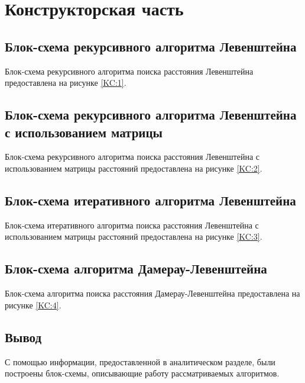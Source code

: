 \documentclass[12pt]{report}
\begin{document}
\newpage

\chapter{Конструкторская часть}
\section{Блок-схема рекурсивного алгоритма Левенштейна}
Блок-схема рекурсивного алгоритма поиска расстояния Левенштейна предоставлена на рисунке \ref{KC:1}.
\section{Блок-схема рекурсивного алгоритма Левенштейна с использованием матрицы}
Блок-схема рекурсивного алгоритма поиска расстояния Левенштейна с использованием матрицы расстояний предоставлена на рисунке \ref{KC:2}.
\section{Блок-схема итеративного алгоритма Левенштейна}
Блок-схема итеративного алгоритма поиска расстояния Левенштейна с использованием матрицы расстояний предоставлена на рисунке \ref{KC:3}.
\section{Блок-схема алгоритма Дамерау-Левенштейна}
Блок-схема алгоритма поиска расстояния Дамерау-Левенштейна предоставлена на рисунке \ref{KC:4}.
\section*{Вывод}
С помощью информации, предоставленной в аналитическом разделе, были построены блок-схемы, описывающие работу рассматриваемых алгоритмов.
\end{document}
